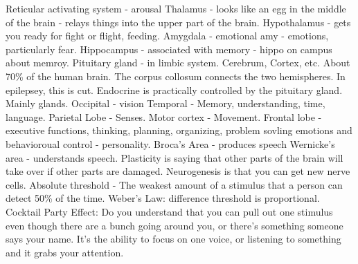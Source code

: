 \markdownRendererUlItem Reticular activating system - arousal\markdownRendererUlItemEnd 
\markdownRendererUlItem Thalamus - looks like an egg in the middle of the brain - relays things into the upper part of the brain.\markdownRendererUlItemEnd 
\markdownRendererUlItem Hypothalamus - gets you ready for fight or flight, feeding.\markdownRendererUlItemEnd 
\markdownRendererUlItem Amygdala - emotional amy - emotions, particularly fear.\markdownRendererUlItemEnd 
\markdownRendererUlItem Hippocampus - associated with memory - hippo on campus about memroy.\markdownRendererUlItemEnd 
\markdownRendererUlItem Pituitary gland - in limbic system.\markdownRendererUlItemEnd 
\markdownRendererUlItem Cerebrum, Cortex, etc. About 70\% of the human brain.\markdownRendererUlItemEnd 
\markdownRendererUlItem The corpus collosum connects the two hemispheres. In epilepsey, this is cut.\markdownRendererUlItemEnd 
\markdownRendererUlItem Endocrine is practically controlled by the pituitary gland. Mainly glands.\markdownRendererUlItemEnd 
\markdownRendererUlEndTight \markdownRendererInterblockSeparator
{}\markdownRendererInterblockSeparator
{}\markdownRendererUlBegin
\markdownRendererUlItem Occipital - vision\markdownRendererUlItemEnd 
\markdownRendererUlItem Temporal - Memory, understanding, time, language.\markdownRendererUlItemEnd 
\markdownRendererUlItem Parietal Lobe - Senses.\markdownRendererUlItemEnd 
\markdownRendererUlItem Motor cortex - Movement.\markdownRendererUlItemEnd 
\markdownRendererUlItem Frontal lobe - executive functions, thinking, planning, organizing, problem sovling emotions and behavioroual control - personality.\markdownRendererUlItemEnd 
\markdownRendererUlItem Broca's Area - produces speech\markdownRendererUlItemEnd 
\markdownRendererUlItem Wernicke's area - understands speech.\markdownRendererUlItemEnd 
\markdownRendererUlItem Plasticity is saying that other parts of the brain will take over if other parts are damaged.\markdownRendererUlItemEnd 
\markdownRendererUlItem Neurogenesis is that you can get new nerve cells.\markdownRendererUlItemEnd 
\markdownRendererUlItem Absolute threshold - The weakest amount of a stimulus that a person can detect 50\% of the time.\markdownRendererUlItemEnd 
\markdownRendererUlItem Weber's Law: difference threshold is proportional.\markdownRendererUlItemEnd 
\markdownRendererUlItem Cocktail Party Effect: Do you understand that you can pull out one stimulus even though there are a bunch going around you, or there's something someone says your name. It's the ability to focus on one voice, or listening to something and it grabs your attention.\markdownRendererUlItemEnd 
